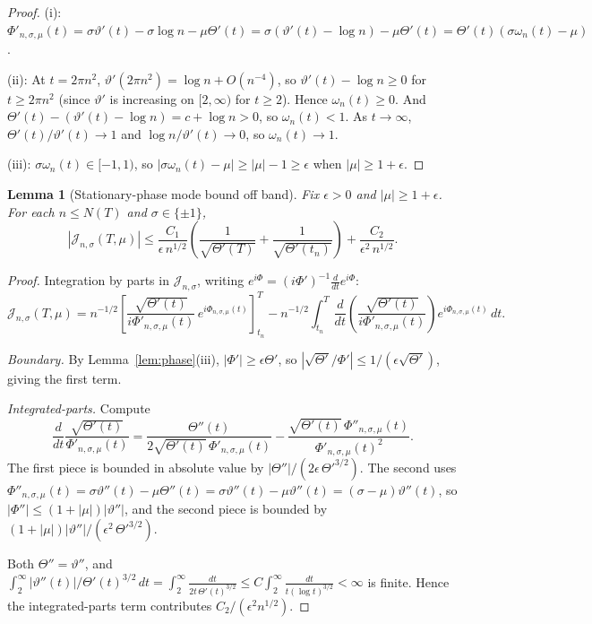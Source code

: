\documentclass[11pt]{article}
\newtheorem{lemma}[theorem]{Lemma}
\theoremstyle{definition}
\theoremstyle{remark}
\begin{document}
\begin{proof}
(i): $\Phi'_{n,\sigma,\mu}(t) = \sigma\vartheta'(t) - \sigma\log n - \mu\Theta'(t) = \sigma(\vartheta'(t)-\log n) - \mu\Theta'(t) = \Theta'(t)(\sigma\omega_n(t) - \mu)$.

(ii): At $t = 2\pi n^2$, $\vartheta'(2\pi n^2) = \log n + O(n^{-4})$, so $\vartheta'(t) - \log n \geq 0$ for $t \geq 2\pi n^2$ (since $\vartheta'$ is increasing on $[2,\infty)$ for $t \geq 2$). Hence $\omega_n(t) \geq 0$. And $\Theta'(t) - (\vartheta'(t) - \log n) = c + \log n > 0$, so $\omega_n(t) < 1$. As $t \to \infty$, $\Theta'(t)/\vartheta'(t) \to 1$ and $\log n/\vartheta'(t) \to 0$, so $\omega_n(t) \to 1$.

(iii): $\sigma\omega_n(t) \in [-1,1)$, so $|\sigma\omega_n(t) - \mu| \geq |\mu| - 1 \geq \epsilon$ when $|\mu| \geq 1+\epsilon$.
\end{proof}

\begin{lemma}[Stationary-phase mode bound off band]\label{lem:modebound}
Fix $\epsilon > 0$ and $|\mu| \geq 1+\epsilon$. For each $n \leq N(T)$ and $\sigma \in \{\pm 1\}$,
\[
|\mathcal J_{n,\sigma}(T,\mu)| \leq \frac{C_1}{\epsilon\, n^{1/2}}\left(\frac{1}{\sqrt{\Theta'(T)}} + \frac{1}{\sqrt{\Theta'(t_n)}}\right) + \frac{C_2}{\epsilon^2\, n^{1/2}}.
\]
\end{lemma}

\begin{proof}
Integration by parts in $\mathcal J_{n,\sigma}$, writing $e^{i\Phi} = (i\Phi')^{-1}\frac{d}{dt}e^{i\Phi}$:
\[
\mathcal J_{n,\sigma}(T,\mu) = n^{-1/2}\left[\frac{\sqrt{\Theta'(t)}}{i\Phi'_{n,\sigma,\mu}(t)}\,e^{i\Phi_{n,\sigma,\mu}(t)}\right]_{t_n}^{T} - n^{-1/2}\int_{t_n}^T \frac{d}{dt}\!\left(\frac{\sqrt{\Theta'(t)}}{i\Phi'_{n,\sigma,\mu}(t)}\right) e^{i\Phi_{n,\sigma,\mu}(t)}\, dt.
\]

\emph{Boundary.} By Lemma~\ref{lem:phase}(iii), $|\Phi'| \geq \epsilon\Theta'$, so
$\left|\sqrt{\Theta'}/\Phi'\right| \leq 1/(\epsilon\sqrt{\Theta'})$, giving the first term.

\emph{Integrated-parts.} Compute
\[
\frac{d}{dt}\!\frac{\sqrt{\Theta'(t)}}{\Phi'_{n,\sigma,\mu}(t)} = \frac{\Theta''(t)}{2\sqrt{\Theta'(t)}\,\Phi'_{n,\sigma,\mu}(t)} - \frac{\sqrt{\Theta'(t)}\,\Phi''_{n,\sigma,\mu}(t)}{\Phi'_{n,\sigma,\mu}(t)^2}.
\]
The first piece is bounded in absolute value by $|\Theta''|/(2\epsilon\,\Theta'^{3/2})$. The second uses $\Phi''_{n,\sigma,\mu}(t) = \sigma\vartheta''(t) - \mu\Theta''(t) = \sigma\vartheta''(t) - \mu\vartheta''(t) = (\sigma - \mu)\vartheta''(t)$, so $|\Phi''| \leq (1+|\mu|)|\vartheta''|$, and the second piece is bounded by $(1+|\mu|)|\vartheta''|/(\epsilon^2\,\Theta'^{3/2})$.

Both $\Theta'' = \vartheta''$, and $\int_2^\infty |\vartheta''(t)|/\Theta'(t)^{3/2}\, dt = \int_2^\infty \frac{dt}{2t\, \Theta'(t)^{3/2}} \leq C\int_2^\infty \frac{dt}{t(\log t)^{3/2}} < \infty$ is finite. Hence the integrated-parts term contributes $C_2/(\epsilon^2 n^{1/2})$.
\end{proof}
\end{document}

